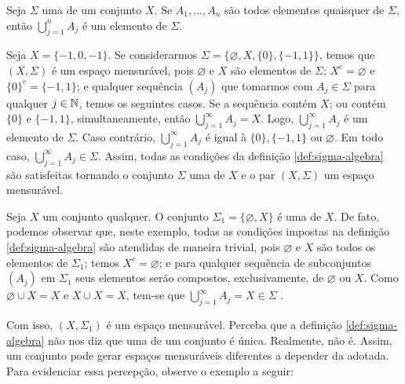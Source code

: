 \begin{proposition}
\label{prop:sigma-união-finita}
    Seja $\Sigma$ uma \sigal de um conjunto $X$. Se $A_1, ..., A_n$ são todos elementos quaisquer de $\Sigma$, então $\displaystyle \bigcup_{j = 1}^n A_j$ é um elemento de $\Sigma$.
\end{proposition}
 
\begin{example}
    Seja $X = \{-1,0,-1\}$. Se considerarmos $\Sigma = \{\varnothing, X, \{0\}, \{-1,1\}\}$, temos que $(X, \Sigma)$ é um espaço mensurável, pois $\varnothing$ e  $X$ são elementos de  $\Sigma$; $X^c = \varnothing$ e $\{0\}^c = \{-1, 1\}$; e qualquer sequência $(A_j)$ que tomarmos com $A_j \in \Sigma$ para qualquer $j \in \operatorname{\mathbb{N}}$, temos os seguintes casos. 
Se a sequência contém $X$; ou contém $\{0\}$ e $\{-1,1\}$, simultaneamente, então $\displaystyle \bigcup_{j = 1}^\infty A_j = X$. 
Logo, $\displaystyle \bigcup_{j = 1}^\infty A_j$  é um elemento de $\Sigma$.  
Caso contrário, $\displaystyle \bigcup_{j = 1}^\infty A_j$ é igual à $\{0\}, \{-1,1\}$ ou $\varnothing$. 
Em todo caso, $\displaystyle \bigcup_{j = 1}^\infty A_j \in \Sigma$.
Assim, todas as condições da definição \ref{def:sigma-algebra} são satisfeitas tornando o conjunto $\Sigma$ uma \sigal de $X$ e o par $(X, \Sigma)$ um espaço mensurável. 
\end{example}

\begin{example}
\label{ex:sigma-trivial}
    Seja $X$ um conjunto qualquer.
    O conjunto $\Sigma_1 = \{\varnothing, X\}$ é uma \sigal de $X$.
    De fato, podemos observar que, neste exemplo, todas as condições impostas na definição \ref{def:sigma-algebra} são atendidas de maneira trivial, pois 
    $\varnothing$ e $X$ são todos os elementos de $\Sigma_1$; temos $X^c = \varnothing$; e para qualquer sequência de subconjuntos $(A_j)$ em $\Sigma_1$ seus elementos serão compostos, exclusivamente, de $\varnothing$ ou $X$. 
    Como $\varnothing \cup X = X$ e $X \cup X = X$, tem-se que $\displaystyle \bigcup_{j = 1}^\infty A_j = X \in \Sigma$ .
\end{example}

Com isso,  $(X, \Sigma_1)$ é um espaço mensurável. 
Perceba que a definição \ref{def:sigma-algebra} não nos diz que uma \sigal de um conjunto é única.
Realmente, não é. 
Assim, um conjunto pode gerar espaços mensuráveis diferentes a depender da \sigal adotada.
Para evidenciar essa percepção, observe o exemplo a seguir:

